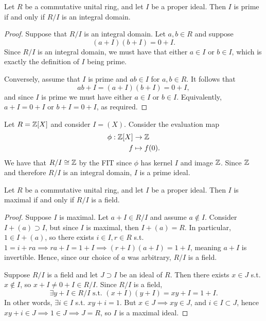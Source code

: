 \begin{theorem}
  Let $R$ be a commutative unital ring, and let $I$ be a proper ideal. Then $I$ is prime
  if and only if $R/I$ is an integral domain.
  \label{<+label+>}
\end{theorem}
\begin{proof}
  Suppose that $R/I$ is an integral domain. Let $a,b\in R$ and suppose 
  $$(a+I)(b+I)=0+I.$$
  Since $R/I$ is an integral domain, we must have that either $a\in I$ or $b\in I$, which is exactly the definition of $I$ being prime.

  Conversely, assume that $I$ is prime and $ab \in I$ for $a,b \in R$. 
  It follows that $$ab+I=(a+I)(b+I)=0+I,$$
  and since $I$ is prime we must have either $a \in I$ or $b \in I.$ Equivalently, $a+I=0+I$ or $b+I=0+I$, as required.
\end{proof}


\begin{example}
  Let $R=\mathbb Z[X]$ and consider $I=(X)$. Consider the evaluation map
  \begin{align*}
  \phi: \mathbb Z[X]&\to \mathbb Z
  \\ f &\mapsto f(0).
  \end{align*}
  We have that $R/I\cong\mathbb Z$ by the FIT since $\phi$ has kernel $I$ and image $\mathbb Z$. Since $\mathbb Z$ and therefore $R/I$ is an integral domain, $I$ is a prime ideal.
\end{example}

\begin{theorem}
  Let $R$ be a commutative unital ring, and let $I$ be a proper ideal. Then $I$ is maximal
  if and only if $R/I$ is a field.
  \label{<+label+>}
\end{theorem}
\begin{proof}
  Suppose $I$ is maximal. Let $a+I\in R/I$ and assume $a\not\in I$. Consider $I+(a) \supset I$, but since $I$ is
  maximal, then $I+(a)= R$. In particular, $1\in I+(a)$, so there exists $i\in I, r\in R$
  s.t. $1=i+ra\implies ra+I=1+I \implies (r+I)(a+I)=1+I$, meaning $a+I$ is invertible. Hence, since our choice of $a$ was arbitrary, $R/I$ is a field.


  Suppose $R/I$ is a field and let $J\supset I$ be an ideal of $R$. Then there exists $x\in J$ s.t.
  $x\not\in I$, so $x+I\neq 0+I\in R/I$. Since $R/I$ is a field, $$\exists y+I\in R/I
 \text{ s.t. } (x+I)(y+I)=xy+I = 1+I.$$ In other words, $\exists i\in I$ s.t. $xy+i=1$. But $x\in J\implies xy\in J$, and 
  $i\in I\subset J$, hence $xy+i\in J\implies 1\in J \implies J=R$, so $I$ is a maximal ideal.
\end{proof}


